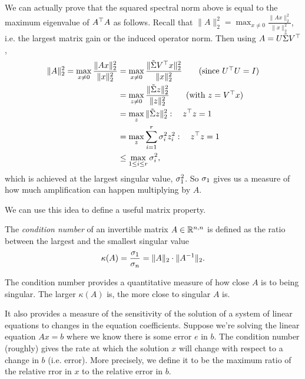\documentclass[11 pt]{scrartcl}
\begin{document}
We can actually prove that the squared spectral norm above is equal to the maximum eigenvalue of $A^\top A$ as follows. 
Recall that $\|A\|_2^2 = \max_{x\not= 0} \frac{\|Ax\|_2^2}{\|x\|_2^2}$, i.e. the largest matrix gain or the induced operator norm. 
Then using $A = U\tilde{\Sigma} V^\top$,
\begin{align*}
    \|A\|_2^2 = \max_{x\not= 0} \dfrac{\|Ax\|_2^2}{\|x\|_2^2} &= \max_{x\not= 0} \dfrac{\|\tsig V^\T x \|_2^2}{\|x\|_2^2} \tag{since $U^\T U = I$} \\ 
                                                              &= \max_{z\not= 0} \dfrac{\|\tsig z\|_2^2}{\|z\|_2^2} \tag{with $z = V^\T x$} \\ 
                                                              &= \max_z \|\tsig z \|_2^2 : \quad z^\T z = 1 \\ 
                                                              &= \max_z \sum_{i=1}^r \si_i^2 z_i^2 : \quad z^\T z = 1 \\ 
                                                              &\leq \max_{1\leq i \leq r} \si_i^2,
\end{align*}
which is achieved at the largest singular value, $\sigma_1^2$. 
So $\sigma_1$ gives us a measure of how much amplification can happen multiplying by $A$.

We can use this idea to define a useful matrix property.
\begin{definition}
    The \emph{condition number} of an invertible matrix $A\in \mathbb R^{n,n}$ is defined as the ratio between the largest and the smallest singular value 
    \[ \kappa(A) = \frac{\sigma_1}{\sigma_n} = \|A\|_2\cdot\|A^{-1}\|_2.\] 
\end{definition}

The condition number provides a quantitative measure of how close $A$ is to being singular. 
The larger $\kappa(A)$ is, the more close to singular $A$ is. 

It also provides a measure of the sensitivity of the solution of a system of linear equations to changes in the equation coefficients.
Suppose we're solving the linear equation $Ax = b$ where we know there is some error $e$ in $b$. 
The condition number (roughly) gives the rate at which the solution $x$ will change with respect to a change in $b$ (i.e. error). 
More precisely, we define it to be the maximum ratio of the relative rror in $x$ to the relative error in $b$. 
\end{document}
